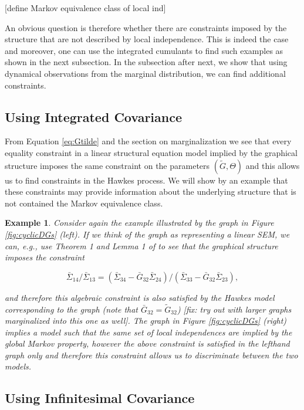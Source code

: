 \documentclass[accepted]{uai2021} %
\newtheorem{exmp}[thm]{Example}
\begin{document}
[define Markov equivalence class of local ind]

An obvious question is therefore whether there are constraints imposed by the 
 structure that are not described by local independence. This is indeed the 
 case 
 and moreover, one can use the integrated cumulants to find such examples as 
 shown in the next subsection. In the subsection after next, we show that using 
 dynamical observations from the marginal distribution, we can find additional 
 constraints.



\subsection{Using Integrated Covariance}

From Equation \ref{eq:Gtilde} and the section on marginalization we see that 
every equality 
constraint in a linear structural equation model implied by the graphical 
structure imposes the same constraint
on the parameters $(\tilde{G}, \Theta)$ and this allows us to find constraints 
in the Hawkes process. We will show by an example that these constraints may 
provide information about the underlying structure that is not contained the 
Markov equivalence class.

\begin{exmp}
	Consider again the example illustrated by the graph in Figure 
	\ref{fig:cyclicDGs} (left). If we think of the graph as representing a 
	linear SEM, we can, e.g., use Theorem 1 and Lemma 1 of \cite{chen2014} to 
	see that the graphical structure imposes the constraint 
	
	$$\bar{\Sigma}_{14}/\bar{\Sigma}_{13} = (\bar{\Sigma}_{34} - 
	\bar{G}_{32}\bar{\Sigma}_{24})/(\bar{\Sigma}_{33} - 
	\bar{G}_{32}\bar{\Sigma}_{23}),$$ 
	
	and 
	therefore this algebraic constraint is also satisfied by the Hawkes model 
	corresponding to the graph (note that $\bar{G}_{32} = \tilde{G}_{32}$) 
	[fix: try out with larger graphs marginalized 
	into this one as well]. The graph in Figure \ref{fig:cyclicDGs} (right) 
	implies a model such that the same set of local independences are implied 
	by the global Markov property, however the above constraint is satisfied in 
	the lefthand graph only and therefore this constraint allows us to 
	discriminate between the two models.
\end{exmp}


\subsection{Using Infinitesimal Covariance}
\label{ssec:eqInfCov}
\end{document}
